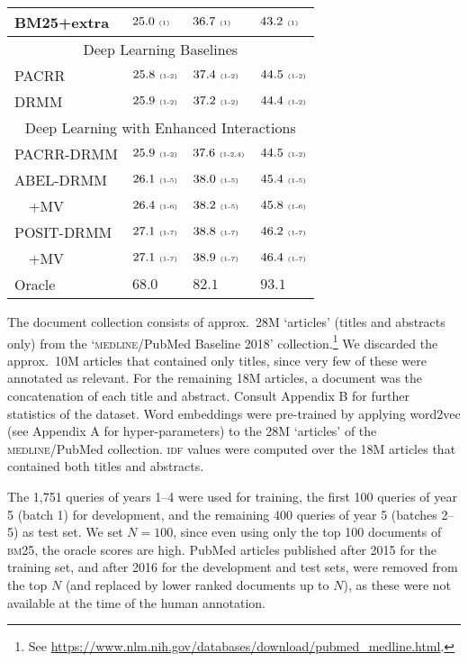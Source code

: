 \documentclass[11pt,a4paper]{article}
\newcommand{\st}[1]{\ {\tiny \mbox{(#1)}}\xspace}
\newcommand{\trecrob}{\textsc{trec robust}\xspace}
\newcommand{\drmm}{\textsc{drmm}\xspace}
\newcommand{\pacrr}{\textsc{pacrr}\xspace}
\newcommand{\pacrrdrmm}{\textsc{pacrr-drmm}\xspace}
\newcommand{\abeldrmm}{\textsc{abel-drmm}\xspace}
\newcommand{\abeldrmmmv}{\textsc{abel-drmm+mv}\xspace}
\newcommand{\bmtf}{\textsc{bm25}\xspace}
\newcommand{\idf}{\textsc{idf}\xspace}
\newcommand{\medline}{\textsc{medline}\xspace}
\begin{document}
\begin{table*}[t]
\begin{minipage}{3.1in}
\begin{center}
\begin{tabular}{|llll|}
BM25+extra  & $25.0\st{1}$ & $36.7\st{1}$ & $43.2\st{1}$ \\ \hline
\multicolumn{4}{|c|}{Deep Learning Baselines} \\ \hline
PACRR       & $25.8\st{1-2}$ & $37.4\st{1-2}$ & $44.5\st{1-2}$ \\
DRMM        & $25.9\st{1-2}$ & $37.2\st{1-2}$ & $44.4\st{1-2}$\\ \hline
\multicolumn{4}{|c|}{Deep Learning with Enhanced Interactions} \\ \hline
PACRR-DRMM  & $25.9\st{1-2}$ & $37.6\st{1-2,4}$ & $44.5\st{1-2}$ \\
ABEL-DRMM   & $26.1\st{1-5}$ & $38.0\st{1-5}$ & $45.4\st{1-5}$ \\
$\quad$+MV  & $26.4\st{1-6}$ & $38.2\st{1-5}$ & $45.8\st{1-6}$ \\
POSIT-DRMM  & $27.1\st{1-7}$ & $38.8\st{1-7}$ & $46.2\st{1-7}$\\
$\quad$+MV  & $27.1\st{1-7}$ & $38.9\st{1-7}$ & $46.4\st{1-7}$\\ \hline\hline
Oracle      & $68.0$ & $82.1$ & $93.1$ \\ \hline
\end{tabular}
\end{center}
\end{minipage}
\vspace{-0.1in}
\caption{Performance on \trecrob 
test data. Statistically significant ($p < 0.05$) 
difference from  \bmtf$\!\!^1$; {\sc bm25}+extra$^2$; \pacrr$\!\!^3$; \drmm$\!^4$; \pacrrdrmm$\!^5$; \abeldrmm$\!^6$; \abeldrmmmv$\!^7$.}
\label{tab:rob04-test}
\vspace{-2mm}
\end{table*}

The document collection consists of approx.\
28M `articles' (titles and abstracts only) from the `\medline/PubMed Baseline 2018' collection.\footnote{See \url{https://www.nlm.nih.gov/databases/download/pubmed_medline.html}.} We discarded the approx.\ 10M articles that contained only titles, since very few of these were annotated as relevant. For  the remaining 18M articles, a document was the concatenation of each title and abstract. Consult Appendix B for further statistics of the dataset. Word embeddings were pre-trained by applying word2vec \cite{mikolov2013distributed} (see Appendix A for hyper-parameters) to the 28M `articles' of the \medline/PubMed collection. \idf values were computed over the 18M articles that contained both titles and abstracts.

The 1,751 queries of years 1--4 were used for training, the first 100 queries of year 5 (batch 1) for development, and the remaining 400 queries of year 5 (batches 2--5) as test set. We set $N=100$, since even using only the top 100 documents of \bmtf, the oracle scores are high. 
PubMed articles published after 2015 for the training set, and after 2016 for the development and test sets, were removed from the top $N$ (and replaced by lower ranked documents up to $N$), as these were not available at the time of the human annotation.
\end{document}
